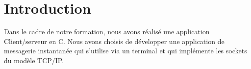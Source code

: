 \section{Introduction}
Dans le cadre de notre formation, nous avons réalisé une application Client/serveur en C. Nous avons choisis de développer une application de messagerie instantanée qui s'utilise via un terminal et qui implémente les sockets du modèle TCP/IP.